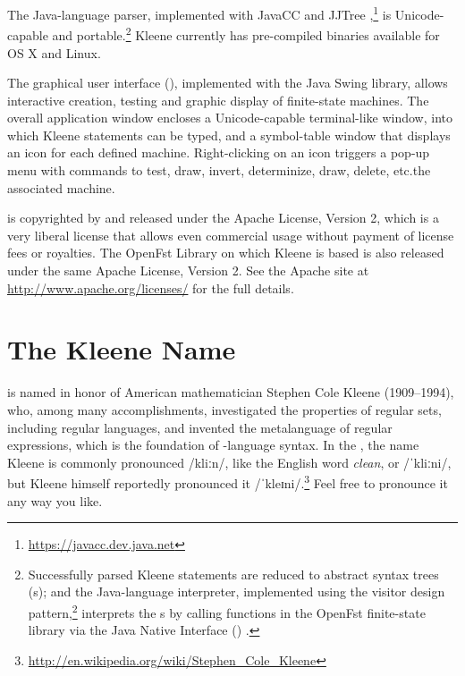 The Java-language \Kleene{} parser, implemented with JavaCC and
JJTree \citep{copeland:2007},\footnote{\url{https://javacc.dev.java.net}} 
is Unicode-capable and portable.\footnote{Successfully parsed Kleene statements are reduced to abstract
syntax trees (s); and the Java-language interpreter,
implemented using the visitor design
pattern,\footnote{\url{http://en.wikipedia.org/wiki/Visitor_pattern}} 
interprets the s by calling \CPP{} functions in the
OpenFst finite-state 
library
\citep{allauzen+riley+schalkwyk+skut+mohri:2007}
via the Java Native Interface
() \citep{gordon:1998,liang:1999}. } Kleene currently has
pre-compiled binaries available for
OS X and Linux.

The \Kleene{} graphical user interface (), implemented with 
the Java Swing library, 
allows interactive creation, testing and graphic display
of finite-state machines.  The overall application window encloses a Unicode-capable terminal-like window, into which Kleene statements
can be typed,
and a symbol-table window that displays an icon for each defined
machine.  Right-clicking on an icon triggers a pop-up menu with
commands to test, draw, invert, determinize, draw, delete, 
etc.\@ the associated machine.

\Kleene{} is copyrighted by   and released under the Apache License, Version 2, which
is a very liberal license that allows even commercial usage without payment of license fees or
royalties.  The OpenFst Library on which Kleene is based is also released under the same Apache License,
Version 2.  See the Apache site at \url{http://www.apache.org/licenses/} for the full details.

\section{The Kleene Name}

\Kleene{} is named in honor of American mathematician Stephen Cole Kleene
(1909--1994), who, among many accomplishments, investigated the properties of regular sets, including
regular languages, and invented the metalanguage of regular expressions, which is the foundation of
\Kleene{}-language syntax.  In the , the name Kleene is
commonly pronounced /kliːn/, like the English word \emph{clean}, 
or /ˈkliːni/, but Kleene himself reportedly pronounced it
/ˈkleɪni/.\footnote{\url{http://en.wikipedia.org/wiki/Stephen_Cole_Kleene}}
Feel free to pronounce it any way you like.

